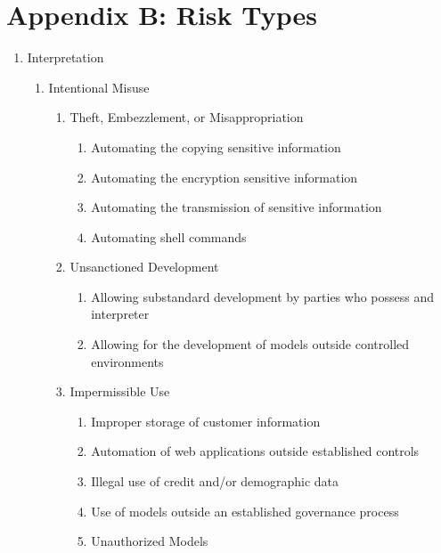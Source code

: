 \section{Appendix B: Risk Types}
\label{sec:appendix_b}

\thispagestyle{section_start_style}

\begin{enumerate}

        \item Interpretation
        \begin{enumerate}

                \item Intentional Misuse
                \begin{enumerate}
                        \item Theft, Embezzlement, or Misappropriation
                        \begin{enumerate}
                                \item Automating the copying sensitive information
                                \item Automating the encryption sensitive information
                                \item Automating the transmission of sensitive information
                                \item Automating shell commands
                        \end{enumerate}
                        \item Unsanctioned Development
                        \begin{enumerate}
                                \item Allowing substandard development by parties who possess and interpreter
                                \item Allowing for the development of models outside controlled environments
                        \end{enumerate}
                        \item Impermissible Use
                        \begin{enumerate}
                                \item Improper storage of customer information
                                \item Automation of web applications outside established controls
                                \item Illegal use of credit and/or demographic data
                                \item Use of models outside an established governance process
                                \item Unauthorized Models
                        \end{enumerate}
                \end{enumerate}


\end{enumerate}
\end{enumerate}
